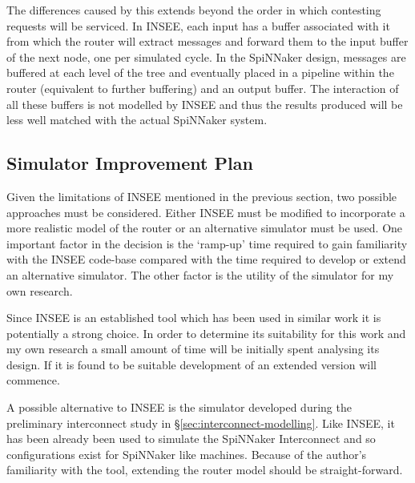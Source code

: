 			The differences caused by this extends beyond the order in which
			contesting requests will be serviced. In INSEE, each input has a buffer
			associated with it from which the router will extract messages and forward
			them to the input buffer of the next node, one per simulated cycle. In the
			SpiNNaker design, messages are buffered at each level of the tree and
			eventually placed in a pipeline within the router (equivalent to further
			buffering) and an output buffer. The interaction of all these buffers is
			not modelled by INSEE and thus the results produced will be less well
			matched with the actual SpiNNaker system.
			
		
		\subsection{Simulator Improvement Plan}
			
			\label{sec:simulator-improvement-plan}
			
			Given the limitations of INSEE mentioned in the previous section, two
			possible approaches must be considered. Either INSEE must be modified to
			incorporate a more realistic model of the router or an alternative
			simulator must be used.  One important factor in the decision is the
			`ramp-up' time required to gain familiarity with the INSEE code-base
			compared with the time required to develop or extend an alternative
			simulator. The other factor is the utility of the simulator for my own
			research.
			
			Since INSEE is an established tool which has been used in similar work it
			is potentially a strong choice. In order to determine its suitability for
			this work and my own research a small amount of time will be initially
			spent analysing its design. If it is found to be suitable development of
			an extended version will commence.
			
			A possible alternative to INSEE is the simulator developed during the
			preliminary interconnect study in \S\ref{sec:interconnect-modelling}.
			Like INSEE, it has been already been used to simulate the SpiNNaker
			Interconnect and so configurations exist for SpiNNaker like machines.
			Because of the author's familiarity with the tool, extending the router
			model should be straight-forward.
	
